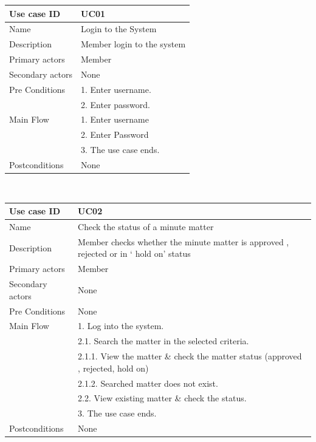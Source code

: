 \documentclass[a4paper,beamer]{article}
\begin{document}
			\begin{tabular}{|p{4cm}|p{8cm}|} \hline 
					\textbf{Use case ID} & \textbf{UC01}  \\ \hline
					Name & Login to the System \\ \hline 
					Description & Member login to the system \\ \hline 
					Primary actors & Member \\ \hline 
					Secondary actors & None \\ \hline 
					Pre Conditions & 1. Enter username. \\
												& 2. Enter password.\\ \hline 
					Main Flow & 1. Enter username \\
										& 2. Enter Password \\  
										& 3. The use case ends. \\ \hline
					Postconditions & None \\ \hline 
			\end{tabular} \\[.6cm]
			
			\begin{tabular}{|p{4cm}|p{8cm}|} \hline 
					\textbf{Use case ID} & \textbf{UC02}  \\ \hline
					Name & Check the status of a minute matter \\ \hline 
					Description & Member checks whether the minute matter is approved  , rejected or in ‘ hold on’ status \\ \hline 
					Primary actors & Member \\ \hline 
					Secondary actors & None \\ \hline 
					Pre Conditions & None \\ \hline 
					Main Flow & 1. Log into the system. \\
										&	2.1. Search the matter in the selected criteria. \\
										&	2.1.1. View the matter \& check the matter status (approved , rejected, hold on) \\
										&	2.1.2. Searched matter does not exist.\\ 
										&	2.2. View existing matter \& check the status.  \\
										&	3. The use case ends.\\ \hline		
					Postconditions & None \\ \hline 
			\end{tabular} \\[.6cm]
			
\end{document}
